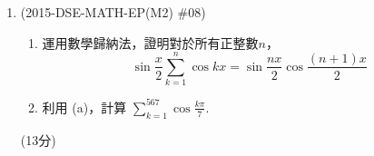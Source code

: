 \documentclass[12pt]{article}
\begin{document}
\begin{enumerate}
            \hrulefill
            
            \hrulefill
            
            \hrulefill
            
            \hrulefill
            
            \hrulefill
            
            \hrulefill
            
            \hrulefill
            
            \hrulefill
            
            \hrulefill
            
            \hrulefill

        \pagebreak
        \item (2015-DSE-MATH-EP(M2) \#08) \begin{enumerate}
            \item 運用數學歸納法，證明對於所有正整數$n$，$$\sin{\frac{x}{2}}\sum_{k=1}^{n}\cos{kx}=\sin{\frac{nx}{2}}\cos{\frac{(n+1)x}{2}}$$
            \item 利用 (a)，計算 $\displaystyle\sum_{k=1}^{567}\cos{\frac{k\pi}{7}}$.
        \end{enumerate}\hfill(13分)
            
            \hrulefill
            
            \hrulefill
            
            \hrulefill
            
            \hrulefill
            
            \hrulefill
            
            \hrulefill
            
            \hrulefill
            
            \hrulefill
            
            \hrulefill
            
            \hrulefill
            
            \hrulefill
            
            \hrulefill
            
            \hrulefill
            
            \hrulefill
            
            \hrulefill
            
            \hrulefill
            
            \hrulefill
            

\end{enumerate}
\end{document}
